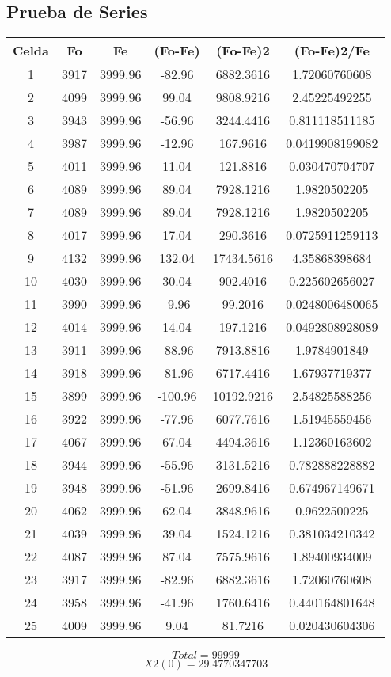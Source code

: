 \documentclass{article}
\begin{document}
\subsection{Prueba de Series}
\begin{tabular}{|c|c|c|c|c|c|}
Celda&Fo&Fe&(Fo{-}Fe)&(Fo{-}Fe)2&(Fo{-}Fe)2/Fe\\
\hline
1&3917&3999.96&{-}82.96&6882.3616&1.72060760608\\
\hline
2&4099&3999.96&99.04&9808.9216&2.45225492255\\
\hline
3&3943&3999.96&{-}56.96&3244.4416&0.811118511185\\
\hline
4&3987&3999.96&{-}12.96&167.9616&0.0419908199082\\
\hline
5&4011&3999.96&11.04&121.8816&0.030470704707\\
\hline
6&4089&3999.96&89.04&7928.1216&1.9820502205\\
\hline
7&4089&3999.96&89.04&7928.1216&1.9820502205\\
\hline
8&4017&3999.96&17.04&290.3616&0.0725911259113\\
\hline
9&4132&3999.96&132.04&17434.5616&4.35868398684\\
\hline
10&4030&3999.96&30.04&902.4016&0.225602656027\\
\hline
11&3990&3999.96&{-}9.96&99.2016&0.0248006480065\\
\hline
12&4014&3999.96&14.04&197.1216&0.0492808928089\\
\hline
13&3911&3999.96&{-}88.96&7913.8816&1.9784901849\\
\hline
14&3918&3999.96&{-}81.96&6717.4416&1.67937719377\\
\hline
15&3899&3999.96&{-}100.96&10192.9216&2.54825588256\\
\hline
16&3922&3999.96&{-}77.96&6077.7616&1.51945559456\\
\hline
17&4067&3999.96&67.04&4494.3616&1.12360163602\\
\hline
18&3944&3999.96&{-}55.96&3131.5216&0.782888228882\\
\hline
19&3948&3999.96&{-}51.96&2699.8416&0.674967149671\\
\hline
20&4062&3999.96&62.04&3848.9616&0.9622500225\\
\hline
21&4039&3999.96&39.04&1524.1216&0.381034210342\\
\hline
22&4087&3999.96&87.04&7575.9616&1.89400934009\\
\hline
23&3917&3999.96&{-}82.96&6882.3616&1.72060760608\\
\hline
24&3958&3999.96&{-}41.96&1760.6416&0.440164801648\\
\hline
25&4009&3999.96&9.04&81.7216&0.020430604306\\
\end{tabular}


$$
Total = 99999
$$
$$
X2(0) = 29.4770347703
$$
\end{document}
